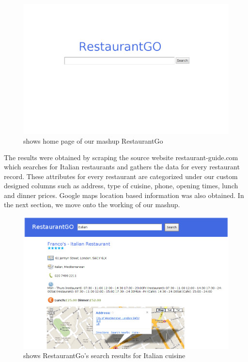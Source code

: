 \begin{figure}[!h]
  \centering
  \includegraphics[width=16cm]{fig/restaurant_go.png}
  \caption[ RestaurantGo home page]
  {shows home page of our mashup RestaurantGo}
  \label{fig: 3.3}
\end{figure}

The results were obtained by scraping the source website restaurant-guide.com which searches for Italian restaurants and gathers the data for every restaurant record. These attributes for every restaurant are categorized under our custom designed columns such as address, type of cuisine, phone, opening times, lunch and dinner prices. Google maps location based information was also obtained. In the next section, we move onto the working of our mashup.

\newpage
\begin{figure}[!h]
  \centering
  \includegraphics[width=16cm]{fig/restaurant_go_results.png}
  \caption[ RestaurantGo search results]
  {shows RestaurantGo's search results for Italian cuisine}
  \label{fig: 3.4}
\end{figure}

